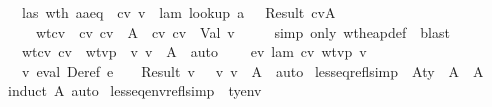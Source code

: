 \begin{isabellebody}
\ \ \isamarkupfalse \ las\ wth\ aaeq\ \isamarkupfalse \ cv\ v{\isacharprime}\ \ lam{\isacharcolon}\ {\isachardoublequoteopen}lookup\ a\ {\isasymmu}\ {\isacharequal}\ Result\ {\isacharparenleft}cv{\isacharcomma}A{\isacharparenright}{\isachardoublequoteclose}\isanewline
\ \ \ \ \ wtcv{\isacharcolon}\ {\isachardoublequoteopen}{\isasymSigma}\ {\isasymturnstile}cv\ cv\ {\isacharcolon}\ A{\isachardoublequoteclose}\ \ cv{\isacharcolon}\ {\isachardoublequoteopen}cv\ {\isacharequal}\ Val\ v{\isacharprime}{\isachardoublequoteclose}\isanewline
\ \ \ \ \isamarkupfalse \ {\isacharparenleft}simp\ only{\isacharcolon}\ wt{\isacharunderscore}heap{\isacharunderscore}def{\isacharparenright}\ \isamarkupfalse \ blast\ \isamarkupfalse \isanewline
\ \ \isamarkupfalse \ wtcv\ cv\ \isamarkupfalse \ wtvp{\isacharcolon}\ {\isachardoublequoteopen}{\isasymSigma}\ {\isasymturnstile}v\ v{\isacharprime}\ {\isacharcolon}\ A{\isachardoublequoteclose}\ \isamarkupfalse \ auto\ \isamarkupfalse \isanewline
\ \ \isamarkupfalse \ ev\ lam\ cv\ wtvp\ v\ \isanewline
\ \ \isamarkupfalse \ {\isachardoublequoteopen}{\isacharparenleft}{\isasymexists}v{\isachardot}\ eval\ {\isacharparenleft}Deref\ e{\isacharparenright}\ {\isasymrho}\ {\isasymmu}\ {\isacharequal}\ Result\ v\ {\isasymand}\ {\isasymSigma}\ {\isasymturnstile}v\ v\ {\isacharcolon}\ A{\isacharparenright}{\isachardoublequoteclose}\ \isamarkupfalse \ auto\isanewline
{}\isamarkupfalse \endisatagproof
{\isafoldproof}\isadelimproof
\isanewline
\endisadelimproof
\isanewline
{}\isamarkupfalse \ lesseq{\isacharunderscore}refl{\isacharbrackleft}simp{\isacharbrackright}{\isacharcolon}\ \ A{\isacharcolon}{\isacharcolon}ty\ \ {\isachardoublequoteopen}A\ {\isasymsqsubseteq}\ A{\isachardoublequoteclose}\isanewline
\isadelimproof
\ \ \endisadelimproof
\isatagproof
{}\isamarkupfalse \ {\isacharparenleft}induct\ A{\isacharparenright}\ auto\endisatagproof
{\isafoldproof}\isadelimproof
\isanewline
\endisadelimproof
\isanewline
{}\isamarkupfalse \ lesseq{\isacharunderscore}env{\isacharunderscore}refl{\isacharbrackleft}simp{\isacharbrackright}{\isacharcolon}\ \ {\isasymSigma}{\isacharcolon}{\isacharcolon}ty{\isacharunderscore}env\ \ {\isachardoublequoteopen}{\isasymSigma}\ {\isasymsqsubseteq}\ {\isasymSigma}{\isachardoublequoteclose}\isanewline

\end{isabellebody}
